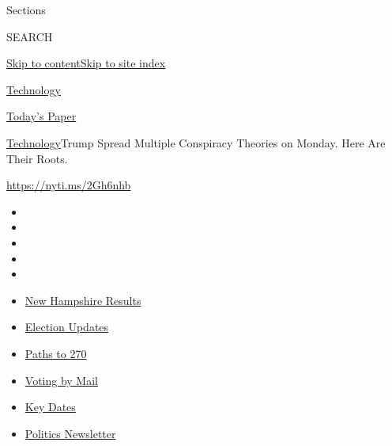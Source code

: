 Sections

SEARCH

\protect\hyperlink{site-content}{Skip to
content}\protect\hyperlink{site-index}{Skip to site index}

\href{https://www.nytimes3xbfgragh.onion/section/technology}{Technology}

\href{https://myaccount.nytimes3xbfgragh.onion/auth/login?response_type=cookie\&client_id=vi}{}

\href{https://www.nytimes3xbfgragh.onion/section/todayspaper}{Today's
Paper}

\href{/section/technology}{Technology}\textbar{}Trump Spread Multiple
Conspiracy Theories on Monday. Here Are Their Roots.

\url{https://nyti.ms/2Gh6nhb}

\begin{itemize}
\item
\item
\item
\item
\item
\end{itemize}

\begin{itemize}
\item
  \href{https://www.nytimes3xbfgragh.onion/interactive/2020/09/08/us/elections/results-new-hampshire-primary-elections.html?action=click\&pgtype=Article\&state=default\&region=TOP_BANNER\&context=storylines_menu}{New
  Hampshire Results}
\item
  \href{https://www.nytimes3xbfgragh.onion/live/2020/09/08/us/trump-vs-biden?action=click\&pgtype=Article\&state=default\&region=TOP_BANNER\&context=storylines_menu}{Election
  Updates}
\item
  \href{https://www.nytimes3xbfgragh.onion/interactive/2020/us/elections/election-states-biden-trump.html?action=click\&pgtype=Article\&state=default\&region=TOP_BANNER\&context=storylines_menu}{Paths
  to 270}
\item
  \href{https://www.nytimes3xbfgragh.onion/interactive/2020/08/31/us/politics/vote-by-mail-deadlines.html?action=click\&pgtype=Article\&state=default\&region=TOP_BANNER\&context=storylines_menu}{Voting
  by Mail}
\item
  \href{https://www.nytimes3xbfgragh.onion/interactive/2019/us/elections/2020-presidential-election-calendar.html?action=click\&pgtype=Article\&state=default\&region=TOP_BANNER\&context=storylines_menu}{Key
  Dates}
\item
  \href{https://www.nytimes3xbfgragh.onion/newsletters/politics?action=click\&pgtype=Article\&state=default\&region=TOP_BANNER\&context=storylines_menu}{Politics
  Newsletter}
\end{itemize}

